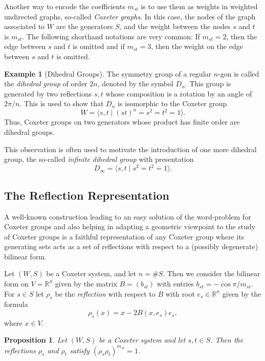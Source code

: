 \documentclass{article}
\newtheorem{proposition}[theorem]{Proposition}
\theoremstyle{definition}
\newtheorem{example}[theorem]{Example}
\begin{document}
Another way to encode the coefficients $m_{st}$ is to use them as weights in weighted undirected graphs, so-called \textit{Coxeter graphs}. In this case, the nodes of the graph associated to $W$ are the generators $S$, and the weight between the nodes $s$ and $t$ is $m_{st}$. The following shorthand notations are very common: If $m_{st} = 2$, then the edge between $s$ and $t$ is omitted and if $m_{st} = 3$, then the weight on the edge between $s$ and $t$ is omitted.

\begin{example}[Dihedral Groups]
The symmetry group of a regular $n$-gon is called the \textit{dihedral group} of order $2n$, denoted by the symbol $D_n$. This group is generated by two reflections $s, t$ whose composition is a rotation by an angle of~$2\pi/n$. This is used to show that $D_n$ is isomorphic to the Coxeter group
$$W = \langle s, t \; | \; (st)^n = s^2 = t^2 = 1 \rangle.$$
Thus, Coxeter groups on two generators whose product has finite order are dihedral groups.

This observation is often used to motivate the introduction of one more dihedral group, the so-called \textit{infinite dihedral group} with presentation
$$D_\infty = \langle s, t \; | \; s^2 = t^2 = 1 \rangle.$$
\end{example}
\subsection{The Reflection Representation}
A well-known construction leading to an easy solution of the word-problem for Coxeter groups and also helping in adapting a geometric viewpoint to the study of Coxeter groups is a faithful representation of any Coxeter group where its generating sets acts as a set of reflections with respect to a (possibly degenerate) bilinear form.

Let $(W,S)$ be a Coxeter system, and let $n = \#S$. Then we consider the bilinear form on $V = \mathbb{R}^S$ given by the matrix $B = (b_{st})$ with entries $b_{st} = -\cos \pi/m_{st}$. 
For $s \in S$ let $\rho_s$ be the \textit{reflection} with respect to $B$ with root $e_s \in \mathbb{R}^n$ given by the formula
$$ \rho_s(x) = x - 2B(x, e_s)e_s,$$
where $x \in V$.

\begin{proposition}\label{prop:reflection-representation-well-defined}
Let $(W,S)$ be a Coxeter system and let $s, t \in S$. Then the reflections $\rho_s$ and $\rho_t$ satisfy $(\rho_s \rho_t)^{m_{st}} = 1$.
\end{proposition}
\end{document}
